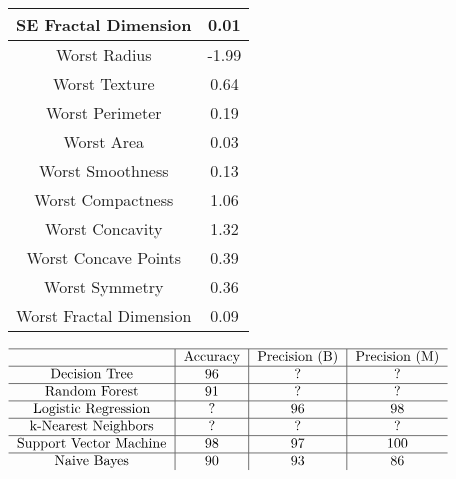 \documentclass[conference]{IEEEtran}
\begin{document}
\begin{table}[h]
\begin{tabular}{c|c}
             \hline
             SE Fractal Dimension & 0.01\\
             \hline
             Worst Radius & -1.99\\
             \hline
             Worst Texture & 0.64\\
             \hline
             Worst Perimeter & 0.19\\
             \hline
             Worst Area & 0.03\\
             \hline
             Worst Smoothness & 0.13\\
             \hline
             Worst Compactness & 1.06\\
             \hline
             Worst Concavity & 1.32\\
             \hline
             Worst Concave Points & 0.39\\
             \hline
             Worst Symmetry & 0.36\\
             \hline
             Worst Fractal Dimension & 0.09
        \end{tabular}

\end{table}

\begin{table}[h]
    \centering
    \caption{\\Algorithm Analysis for Testing Data (Before Fine-tuning)}
    $\begin{tabular}{c|c|c|c}
        \hline
        & Accuracy & Precision (B) & Precision (M)\\
        \hline
        Decision Tree & 96 & ? & ? \\
        \hline
        Random Forest & 91 & ? & ?\\
        \hline
        Logistic Regression & ? & 96 & 98 \\
        \hline
        k-Nearest Neighbors & ? & ? & ?\\
        \hline
        Support Vector Machine & 98 & 97 & 100 \\
        \hline
        Naive Bayes & 90 & 93 & 86\\
    \end{tabular}$

\end{table}
\end{document}

